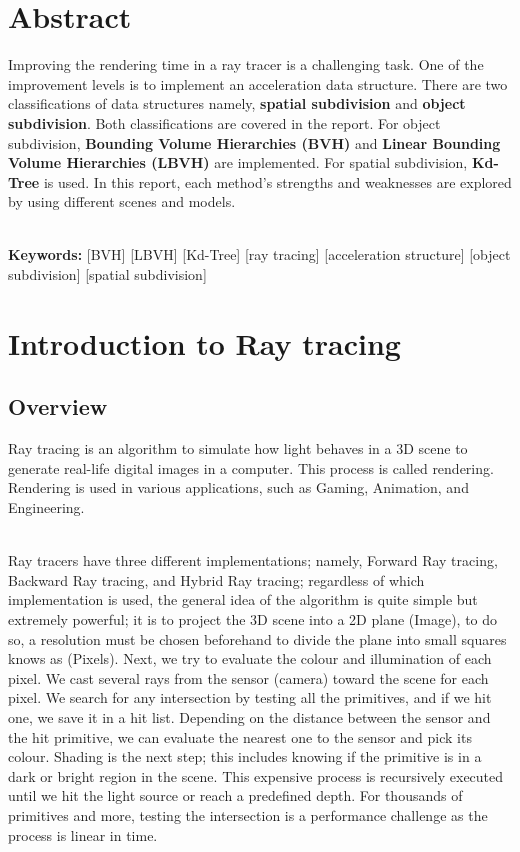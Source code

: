 \documentclass[11pt,a4paper]{article}
\begin{document}
\section*{Abstract}
Improving the rendering time in a ray tracer is a challenging task. One of the improvement levels is to implement an acceleration data structure. There are two classifications of data structures namely, \textbf{spatial subdivision} and \textbf{object subdivision}. Both classifications are covered in the report. For object subdivision, \textbf{Bounding Volume Hierarchies (BVH)} and \textbf{Linear Bounding Volume Hierarchies (LBVH)} are implemented. For spatial subdivision, \textbf{Kd-Tree} is used. In this report, each method's strengths and weaknesses are explored by using different scenes and models.

\noindent
\\
\textbf{Keywords:} [BVH] [LBVH] [Kd-Tree] [ray tracing] [acceleration structure]  [object subdivision] [spatial
subdivision] 
\clearpage
\tableofcontents
\clearpage



\section{Introduction to Ray tracing}
\subsection{Overview}
Ray tracing is an algorithm to simulate how light behaves in a 3D scene to generate real-life digital images in a computer. This process is called rendering. Rendering is used in various applications, such as Gaming, Animation, and Engineering.

\noindent
\\
Ray tracers have three different implementations; namely, Forward Ray tracing, Backward Ray tracing, and Hybrid Ray tracing; regardless of which implementation is used, the general idea of the algorithm is quite simple but extremely powerful; it is to project the 3D scene into a 2D plane (Image), to do so, a resolution must be chosen beforehand to divide the plane into small squares knows as (Pixels). Next, we try to evaluate the colour and illumination of each pixel. We cast several rays from the sensor (camera) toward the scene for each pixel. We search for any intersection by testing all the primitives, and if we hit one, we save it in a hit list. Depending on the distance between the sensor and the hit primitive, we can evaluate the nearest one to the sensor and pick its colour. Shading is the next step; this includes knowing if the primitive is in a dark or bright region in the scene. This expensive process is recursively executed until we hit the light source or reach a predefined depth. For thousands of primitives and more, testing the intersection is a performance challenge as the process is linear in time.
\end{document}
